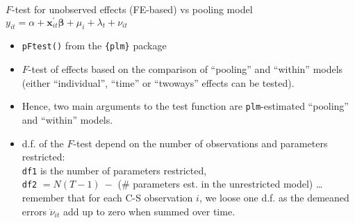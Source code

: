 \documentclass{beamer}
\begin{document}
\begin{frame}{$F$-test for unobserved effects (FE-based) vs pooling model}
$y_{it} = \alpha + \bm{x}^{\prime}_{it} \bm{\beta} + \mu_i + \lambda_t + \nu_{it}$\\ \medskip
\begin{itemize}
    \item \texttt{pFtest()} from the \texttt{\{plm\}} package
    \medskip
    \item $F$-test of effects based on the comparison of ``pooling'' and ``within'' models (either ``individual'', ``time'' or ``twoways'' effects can be tested).
    \medskip
    \item Hence, two main arguments to the test function are \texttt{plm}-estimated ``pooling'' and ``within'' models. 
    \medskip 
    \item d.f. of the $F$-test depend on the number of observations and parameters restricted:\\
    \texttt{df1} is the number of parameters restricted, \\
    \texttt{df2} $= N(T-1)~-$ (\# parameters est. in the unrestricted model)    \dots remember that for each C-S observation $i$, we loose one d.f. as the demeaned errors $\ddot{\nu}_{it}$ add up to zero when summed over time.
\end{itemize}    
\end{frame}
\end{document}
